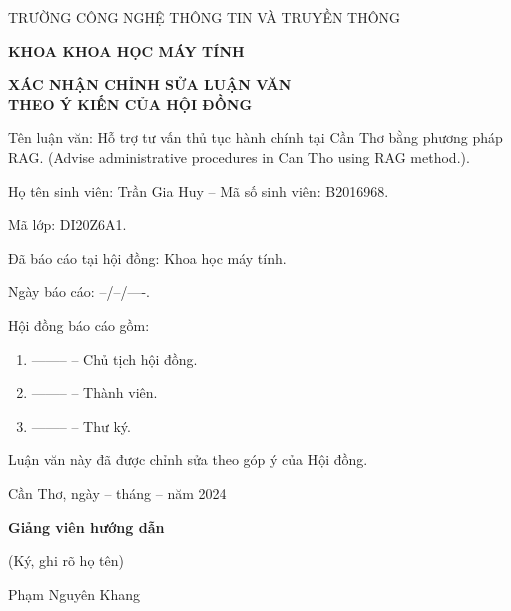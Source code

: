 \begin{center}
    TRƯỜNG CÔNG NGHỆ THÔNG TIN VÀ TRUYỀN THÔNG

    \textbf{KHOA KHOA HỌC MÁY TÍNH}

    \vspace{1.5cm}

    \textbf{\large XÁC NHẬN CHỈNH SỬA LUẬN VĂN \\ THEO Ý KIẾN CỦA HỘI ĐỒNG}
\end{center}

{
\noindent
Tên luận văn: Hỗ trợ tư vấn thủ tục hành chính tại Cần Thơ bằng phương pháp RAG. (Advise administrative procedures in Can Tho using RAG method.).

\noindent
Họ tên sinh viên: Trần Gia Huy -- Mã số sinh viên: B2016968.

\noindent
Mã lớp: DI20Z6A1.

\noindent
Đã báo cáo tại hội đồng: Khoa học máy tính.

\noindent
Ngày báo cáo: --/--/----.

\noindent
Hội đồng báo cáo gồm: %
\begin{enumerate}
    \item -------- -- Chủ tịch hội đồng.
    \item -------- -- Thành viên.
    \item -------- -- Thư ký.
\end{enumerate}

\noindent
Luận văn này đã được chỉnh sửa theo góp ý của Hội đồng.


\begin{multicols}{2}
    \begin{minipage}{\linewidth}
    \end{minipage}

    \begin{minipage}{\linewidth}
        \centering
        Cần Thơ, ngày -- tháng -- năm 2024 %

        \textbf{Giảng viên hướng dẫn}

        (Ký, ghi rõ họ tên) \\

        \vspace{2.5cm}

        Phạm Nguyên Khang
    \end{minipage}
\end{multicols}
}